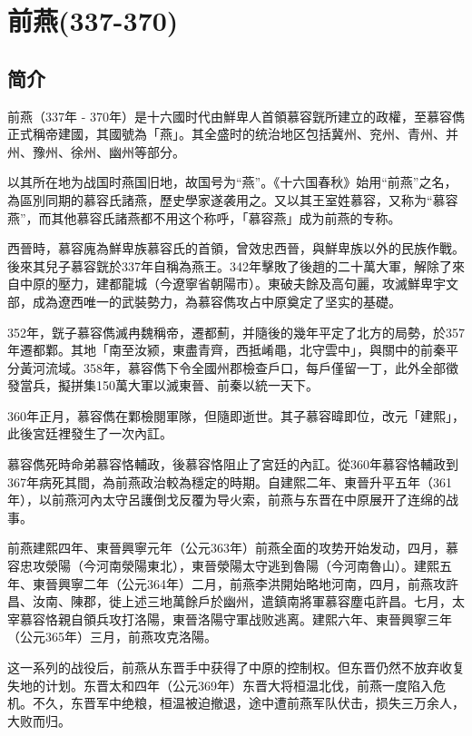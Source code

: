 

\section{前燕\tiny(337-370)}

\subsection{简介}

前燕（337年 - 370年）是十六國时代由鮮卑人首領慕容皝所建立的政權，至慕容儁正式稱帝建國，其國號為「燕」。其全盛时的统治地区包括冀州、兖州、青州、并州、豫州、徐州、幽州等部分。

以其所在地为战国时燕国旧地，故国号为“燕”。《十六国春秋》始用“前燕”之名，為區別同期的慕容氏諸燕，歷史學家遂袭用之。又以其王室姓慕容，又称为“慕容燕”，而其他慕容氏諸燕都不用这个称呼，「慕容燕」成为前燕的专称。

西晉時，慕容廆為鮮卑族慕容氏的首領，曾效忠西晉，與鮮卑族以外的民族作戰。後來其兒子慕容皝於337年自稱為燕王。342年擊敗了後趙的二十萬大軍，解除了來自中原的壓力，建都龍城（今遼寧省朝陽市）。東破夫餘及高句麗，攻滅鮮卑宇文部，成為遼西唯一的武裝勢力，為慕容儁攻占中原奠定了坚实的基礎。

352年，皝子慕容儁滅冉魏稱帝，遷都薊，并隨後的幾年平定了北方的局勢，於357年遷都鄴。其地「南至汝颍，東盡青齊，西抵崤黽，北守雲中」，與關中的前秦平分黃河流域。358年，慕容儁下令全國州郡檢查戶口，每戶僅留一丁，此外全部徵發當兵，擬拼集150萬大軍以滅東晉、前秦以統一天下。

360年正月，慕容儁在鄴檢閱軍隊，但隨即逝世。其子慕容暐即位，改元「建熙」，此後宮廷裡發生了一次內訌。

慕容儁死時命弟慕容恪輔政，後慕容恪阻止了宮廷的內訌。從360年慕容恪輔政到367年病死其間，為前燕政治較為穩定的時期。自建熙二年、東晉升平五年（361年），以前燕河內太守呂護倒戈反覆为导火索，前燕与东晋在中原展开了连绵的战事。

前燕建熙四年、東晉興寧元年（公元363年）前燕全面的攻势开始发动，四月，慕容忠攻滎陽（今河南滎陽東北），東晉滎陽太守逃到魯陽（今河南魯山）。建熙五年、東晉興寧二年（公元364年）二月，前燕李洪開始略地河南，四月，前燕攻許昌、汝南、陳郡，徙上述三地萬餘戶於幽州，遣鎮南將軍慕容塵屯許昌。七月，太宰慕容恪親自領兵攻打洛陽，東晉洛陽守軍战败逃离。建熙六年、東晉興寧三年（公元365年）三月，前燕攻克洛陽。

这一系列的战役后，前燕从东晋手中获得了中原的控制权。但东晋仍然不放弃收复失地的计划。东晋太和四年（公元369年）东晋大将桓温北伐，前燕一度陷入危机。不久，东晋军中绝粮，桓温被迫撤退，途中遭前燕军队伏击，损失三万余人，大败而归。

